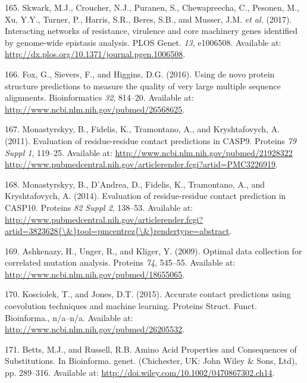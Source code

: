 \documentclass[11pt,a4paper,twoside]{book}
\theoremstyle{definition}
\theoremstyle{definition}
\theoremstyle{remark}
\begin{document}
\hypertarget{ref-Skwark2017}{}
165. Skwark, M.J., Croucher, N.J., Puranen, S., Chewapreecha, C.,
Pesonen, M., Xu, Y.Y., Turner, P., Harris, S.R., Beres, S.B., and
Musser, J.M. \emph{et al.} (2017). Interacting networks of resistance,
virulence and core machinery genes identified by genome-wide epistasis
analysis. PLOS Genet. \emph{13}, e1006508. Available at:
\url{http://dx.plos.org/10.1371/journal.pgen.1006508}.

\hypertarget{ref-Fox2016}{}
166. Fox, G., Sievers, F., and Higgins, D.G. (2016). Using de novo
protein structure predictions to measure the quality of very large
multiple sequence alignments. Bioinformatics \emph{32}, 814--20.
Available at: \url{http://www.ncbi.nlm.nih.gov/pubmed/26568625}.

\hypertarget{ref-Monastyrskyy2011}{}
167. Monastyrskyy, B., Fidelis, K., Tramontano, A., and Kryshtafovych,
A. (2011). Evaluation of residue-residue contact predictions in CASP9.
Proteins \emph{79 Suppl 1}, 119--25. Available at:
\href{http://www.ncbi.nlm.nih.gov/pubmed/21928322\%20http://www.pubmedcentral.nih.gov/articlerender.fcgi?artid=PMC3226919}{http://www.ncbi.nlm.nih.gov/pubmed/21928322 http://www.pubmedcentral.nih.gov/articlerender.fcgi?artid=PMC3226919}.

\hypertarget{ref-Monastyrskyy2014a}{}
168. Monastyrskyy, B., D'Andrea, D., Fidelis, K., Tramontano, A., and
Kryshtafovych, A. (2014). Evaluation of residue-residue contact
prediction in CASP10. Proteins \emph{82 Suppl 2}, 138--53. Available at:
\href{http://www.pubmedcentral.nih.gov/articlerender.fcgi?artid=3823628\%7B/\&\%7Dtool=pmcentrez\%7B/\&\%7Drendertype=abstract}{http://www.pubmedcentral.nih.gov/articlerender.fcgi?artid=3823628\{\textbackslash{}\&\}tool=pmcentrez\{\textbackslash{}\&\}rendertype=abstract}.

\hypertarget{ref-Ashkenazy2009}{}
169. Ashkenazy, H., Unger, R., and Kliger, Y. (2009). Optimal data
collection for correlated mutation analysis. Proteins \emph{74},
545--55. Available at:
\url{http://www.ncbi.nlm.nih.gov/pubmed/18655065}.

\hypertarget{ref-Kosciolek2015a}{}
170. Kosciolek, T., and Jones, D.T. (2015). Accurate contact predictions
using coevolution techniques and machine learning. Proteins Struct.
Funct. Bioinforma., n/a--n/a. Available at:
\url{http://www.ncbi.nlm.nih.gov/pubmed/26205532}.

\hypertarget{ref-Bettsa}{}
171. Betts, M.J., and Russell, R.B. Amino Acid Properties and
Consequences of Substitutions. In Bioinforma. genet. (Chichester, UK:
John Wiley \& Sons, Ltd), pp. 289--316. Available at:
\url{http://doi.wiley.com/10.1002/0470867302.ch14}.
\end{document}
